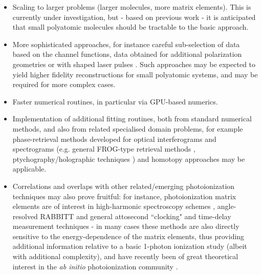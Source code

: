 \begin{itemize}
\item Scaling to larger problems (larger molecules, more matrix elements). This is currently under investigation, but - based on previous work \cite{hockett2009RotationallyResolvedPhotoelectron, hockett2018QMP2} - it is anticipated that small polyatomic molecules should be tractable to the basic approach. 
\item More sophisticated approaches, for instance careful sub-selection of data based on the channel functions, data obtained for additional polarization geometries or with shaped laser pulses \cite{hockett2014CompletePhotoionizationExperiments, hockett2015CoherentControlPhotoelectron, hockett2015CompletePhotoionizationExperiments,hockett2018QMP1}. Such approaches may be expected to yield higher fidelity reconstructions for small polyatomic systems, and may be required for more complex cases.
\item Faster numerical routines, in particular via GPU-based numerics.
\item Implementation of additional fitting routines, both from standard numerical methods, and also from related specialised domain problems, for example phase-retrieval methods developed for optical interferograms and spectrograms (e.g. general FROG-type retrieval methods \cite{trebino2000FrequencyResolvedOpticalGating}, ptychography/holographic techniques \cite{Spangenberg2015b, Spangenberg2015c}) and homotopy \cite{Sommese2005} approaches may be applicable.
\item Correlations and overlaps with other related/emerging photoionization techniques may also prove fruitful: for instance, photoionization matrix elements are of interest in high-harmonic spectroscopy schemes \cite{Lock2012}, angle-resolved RABBITT \cite{hockett2017AngleresolvedRABBITTTheory,villeneuve2017CoherentImagingAttosecond} and general attosecond ``clocking" and time-delay measurement techniques - in many cases these methods are also directly sensitive to the energy-dependence of the matrix elements, thus providing additional information relative to a basic 1-photon ionization study (albeit with additional complexity), and have recently been of great theoretical interest in the \textit{ab initio} photoionization community \cite{Feist2014,benda2022AnalysisRABITTTime}.

\end{itemize}
